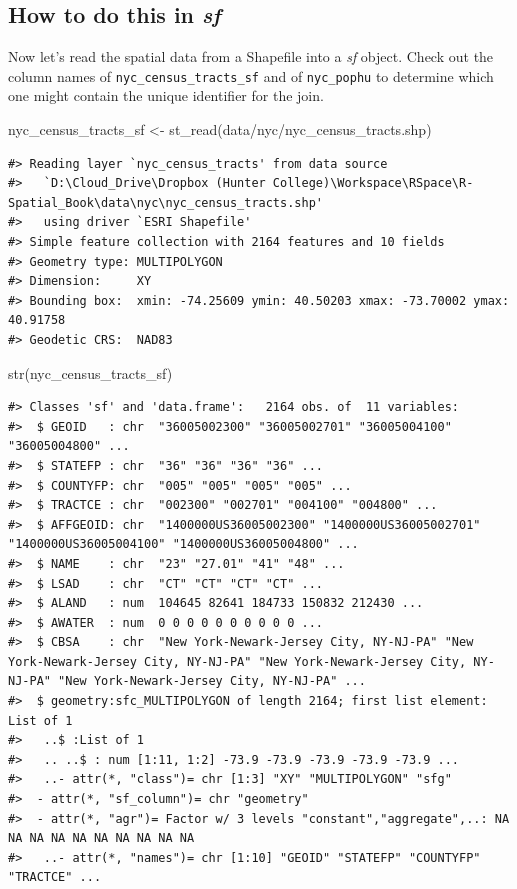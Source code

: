 \documentclass[
  11pt,
]{book}
\newenvironment{Shaded}{\begin{snugshade}}{\end{snugshade}}
\newcommand{\FunctionTok}[1]{\textcolor[rgb]{0.00,0.00,0.00}{#1}}
\newcommand{\NormalTok}[1]{#1}
\newcommand{\OtherTok}[1]{\textcolor[rgb]{0.56,0.35,0.01}{#1}}
\newcommand{\StringTok}[1]{\textcolor[rgb]{0.31,0.60,0.02}{#1}}
\begin{document}
\hypertarget{how-to-do-this-in-sf}{%
\subsection{\texorpdfstring{How to do this in \emph{sf}}{How to do this in sf}}\label{how-to-do-this-in-sf}}

Now let's read the spatial data from a Shapefile into a \emph{sf} object. Check out the column names of \texttt{nyc\_census\_tracts\_sf} and of \texttt{nyc\_pophu} to determine which one might contain the unique identifier for the join.

\begin{Shaded}
\begin{Highlighting}[]
\NormalTok{nyc\_census\_tracts\_sf }\OtherTok{\textless{}{-}} \FunctionTok{st\_read}\NormalTok{(}\StringTok{\textquotesingle{}data/nyc/nyc\_census\_tracts.shp\textquotesingle{}}\NormalTok{)}
\end{Highlighting}
\end{Shaded}

\begin{verbatim}
#> Reading layer `nyc_census_tracts' from data source 
#>   `D:\Cloud_Drive\Dropbox (Hunter College)\Workspace\RSpace\R-Spatial_Book\data\nyc\nyc_census_tracts.shp' 
#>   using driver `ESRI Shapefile'
#> Simple feature collection with 2164 features and 10 fields
#> Geometry type: MULTIPOLYGON
#> Dimension:     XY
#> Bounding box:  xmin: -74.25609 ymin: 40.50203 xmax: -73.70002 ymax: 40.91758
#> Geodetic CRS:  NAD83
\end{verbatim}

\begin{Shaded}
\begin{Highlighting}[]
\FunctionTok{str}\NormalTok{(nyc\_census\_tracts\_sf)}
\end{Highlighting}
\end{Shaded}

\begin{verbatim}
#> Classes 'sf' and 'data.frame':   2164 obs. of  11 variables:
#>  $ GEOID   : chr  "36005002300" "36005002701" "36005004100" "36005004800" ...
#>  $ STATEFP : chr  "36" "36" "36" "36" ...
#>  $ COUNTYFP: chr  "005" "005" "005" "005" ...
#>  $ TRACTCE : chr  "002300" "002701" "004100" "004800" ...
#>  $ AFFGEOID: chr  "1400000US36005002300" "1400000US36005002701" "1400000US36005004100" "1400000US36005004800" ...
#>  $ NAME    : chr  "23" "27.01" "41" "48" ...
#>  $ LSAD    : chr  "CT" "CT" "CT" "CT" ...
#>  $ ALAND   : num  104645 82641 184733 150832 212430 ...
#>  $ AWATER  : num  0 0 0 0 0 0 0 0 0 0 ...
#>  $ CBSA    : chr  "New York-Newark-Jersey City, NY-NJ-PA" "New York-Newark-Jersey City, NY-NJ-PA" "New York-Newark-Jersey City, NY-NJ-PA" "New York-Newark-Jersey City, NY-NJ-PA" ...
#>  $ geometry:sfc_MULTIPOLYGON of length 2164; first list element: List of 1
#>   ..$ :List of 1
#>   .. ..$ : num [1:11, 1:2] -73.9 -73.9 -73.9 -73.9 -73.9 ...
#>   ..- attr(*, "class")= chr [1:3] "XY" "MULTIPOLYGON" "sfg"
#>  - attr(*, "sf_column")= chr "geometry"
#>  - attr(*, "agr")= Factor w/ 3 levels "constant","aggregate",..: NA NA NA NA NA NA NA NA NA NA
#>   ..- attr(*, "names")= chr [1:10] "GEOID" "STATEFP" "COUNTYFP" "TRACTCE" ...
\end{verbatim}
\end{document}
